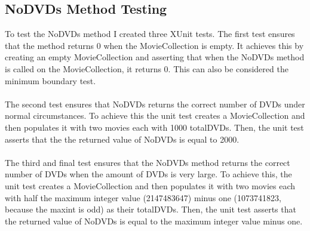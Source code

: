 \documentclass[12pt,a4paper]{article}
\begin{document}
		\subsection{NoDVDs Method Testing}
			To test the NoDVDs method I created three XUnit tests. The first test 
			ensures that the method returns 0 when the MovieCollection is empty. 
			It achieves this by creating an empty MovieCollection and asserting that 
			when the NoDVDs method is called on the MovieCollection, it returns 0. 
			This can also be considered the minimum boundary test.\\ 
			\\
			The second test ensures that NoDVDs returns the correct number of DVDs under 
			normal circumstances. To achieve this the unit test creates a MovieCollection 
			and then populates it with two movies each with 1000 totalDVDs. Then, the 
			unit test asserts that the the returned value of NoDVDs is equal to 2000.\\
			\\
			The third and final test ensures that the NoDVDs method returns the correct 
			number of DVDs when the amount of DVDs is very large. To achieve this, the 
			unit test creates a MovieCollection and then populates it with two movies 
			each with half the maximum integer value (2147483647) minus one (1073741823, 
			because the maxint is odd) as their totalDVDs. Then, the unit test asserts 
			that the returned value of NoDVDs is equal to the maximum integer value 
			minus one.\\ 


			
\end{document}
